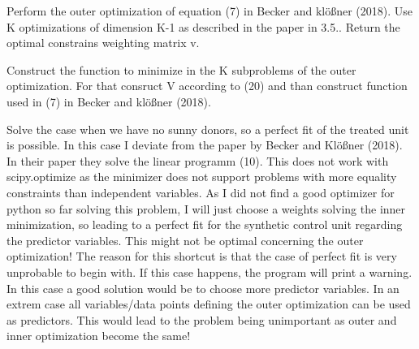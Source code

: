 \documentclass[a4paper,11pt,english]{sphinxmanual}
\begin{document}

\begin{fulllineitems}
\label{model_code:src.model_code.synth_control_functions.outer_optimization}
Perform the outer optimization of equation (7) in Becker and klößner
(2018). Use K optimizations of dimension K-1 as described in the paper
in 3.5.. Return the optimal constrains weighting matrix v.

\end{fulllineitems}


\begin{fulllineitems}
\label{model_code:src.model_code.synth_control_functions.outer_optimization_function}
Construct the function to minimize in the K subproblems of the outer
optimization. For that consruct V according to (20) and than construct
function used in (7) in Becker and klößner (2018).

\end{fulllineitems}


\begin{fulllineitems}
\label{model_code:src.model_code.synth_control_functions.solve_case_of_no_sunny_donors}
Solve the case when we have no sunny donors, so a perfect fit of the
treated unit is possible. In this case I deviate from the paper by
Becker and Klößner (2018). In their paper they solve the linear programm
(10). This does not work with scipy.optimize as the minimizer does not
support problems with more equality constraints than independent variables.
As I did not find a good optimizer for python so far solving this problem,
I will just choose a weights solving the inner minimization, so leading to
a perfect fit for the synthetic control unit regarding the predictor
variables. This might not be optimal concerning the outer optimization!
The reason for this shortcut is that the case of perfect fit is very
unprobable to begin with. If this case happens, the program will print a
warning. In this case a good solution would be to choose more predictor
variables. In an extrem case all variables/data points defining the outer
optimization can be used as predictors. This would lead to the problem being
unimportant as outer and inner optimization become the same!

\end{fulllineitems}
\end{document}
